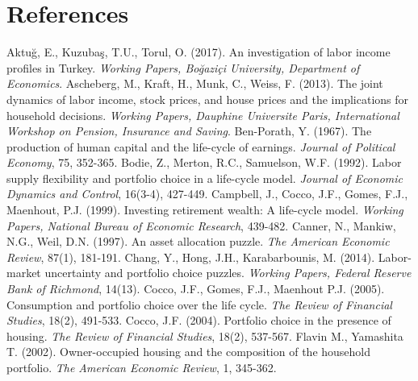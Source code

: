 \chapter*{References}

\begingroup
\renewcommand{\chapter}[2]{}
\begin{thebibliography}{}
 Aktuğ, E., Kuzubaş, T.U., Torul, O. (2017). An investigation of labor income profiles in Turkey. \textit{Working Papers, Boğaziçi  University, Department of Economics}.
 Ascheberg, M., Kraft, H., Munk, C., Weiss, F. (2013). The joint dynamics of labor income, stock prices, and house prices and the implications for household decisions. \textit{Working Papers, Dauphine Universite Paris, International Workshop on Pension, Insurance and Saving}.
 Ben-Porath, Y. (1967). The production  of  human  capital  and  the  life-cycle  of  earnings. \textit{Journal of Political Economy}, 75, 352-365.
Bodie, Z., Merton, R.C., Samuelson, W.F. (1992). Labor supply flexibility and portfolio choice in a life-cycle model. \textit{Journal of Economic Dynamics and Control}, 16(3-4), 427-449. 
 Campbell, J., Cocco, J.F., Gomes, F.J., Maenhout, P.J. (1999). Investing retirement wealth: A life-cycle model. \textit{Working Papers, National Bureau of Economic Research}, 439-482.
 Canner, N., Mankiw, N.G., Weil, D.N. (1997). An asset allocation puzzle. \textit{The American Economic Review}, 87(1), 181-191.
 Chang, Y., Hong, J.H., Karabarbounis, M. (2014). Labor-market uncertainty and portfolio choice puzzles. \textit{Working Papers, Federal Reserve Bank of Richmond}, 14(13).
 Cocco, J.F., Gomes, F.J., Maenhout P.J. (2005). Consumption and portfolio choice over the life cycle. \textit{The Review of Financial Studies}, 18(2), 491-533. 
 Cocco, J.F. (2004). Portfolio choice in the presence of housing. \textit{The Review of Financial Studies}, 18(2), 537-567.
 Flavin M., Yamashita T. (2002). Owner-occupied housing and the composition of the household portfolio. \textit{The American Economic Review}, 1, 345-362.

\end{thebibliography}
